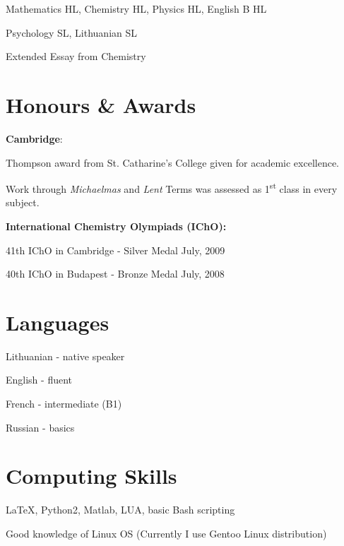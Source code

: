 \begin{innerlist}
  \item Mathematics HL, Chemistry HL, Physics HL, English B HL
  \item Psychology SL, Lithuanian SL
  \item Extended Essay from Chemistry
\end{innerlist}

\section{Honours \& Awards}
\textbf{Cambridge}:
\begin{innerlist}
  \item Thompson award from St. Catharine's College given for academic
    excellence.
  \item Work through \emph{Michaelmas} and \emph{Lent} Terms was assessed as
    1\textsuperscript{st} class in every subject.
\end{innerlist}

\textbf{International Chemistry Olympiads (IChO):}
\begin{innerlist}
  \item 41th IChO in Cambridge - Silver Medal
    \hfill July, 2009
  \item 40th IChO in Budapest - Bronze Medal
    \hfill July, 2008
\end{innerlist}

\section{Languages}
\begin{loneinnerlist}
  \item Lithuanian - native speaker
  \item English - fluent 
  \item French - intermediate (B1)
  \item Russian - basics
\end{loneinnerlist}

\section{Computing Skills}
\begin{loneinnerlist}
  \item \LaTeX, Python2, Matlab, LUA, basic Bash scripting
  \item Good knowledge of Linux OS (Currently I use Gentoo Linux distribution)
\end{loneinnerlist}

